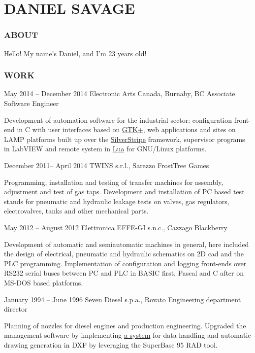 \documentclass[10pt]{tccv}
\begin{document}
\part{DANIEL SAVAGE}

\flafamily

\section{ABOUT}

Hello! My name's Daniel, and I'm 23 years old! 

\section{WORK}

\begin{eventlist}

\item{May 2014 -- December 2014}
     {Electronic Arts Canada, Burnaby, BC}
     {Associate Software Engineer}

Development of automation software for the industrial sector:
configuration front-end in C with user interfaces based on
\href{http://www.gtk.org/}{GTK+}, web applications and sites
on LAMP platforms built up over the
\href{http://www.silverstripe.org/}{SilverStripe} framework,
supervisor programs in LabVIEW and remote system in
\href{http://www.lua.org/}{Lua} for GNU/Linux platforms.

\item{December 2011-- April 2014}
     {TWINS s.r.l., Sarezzo}
     {FrostTree Games}

Programming, installation and testing of transfer machines for assembly,
adjustment and test of gas taps. Development and installation of PC
based test stands for pneumatic and hydraulic leakage tests on valves,
gas regulators, electrovalves, tanks and other mechanical parts.

\item{May 2012 -- August 2012}
     {Elettronica EFFE-GI s.n.c., Cazzago}
     {Blackberry}

Development of automatic and semiautomatic machines in general, here
included the design of electrical, pneumatic and hydraulic schematics on
2D cad and the PLC programming. Implementation of configuration and
logging front-ends over RS232 serial buses between PC and PLC in BASIC
first, Pascal and C after on MS-DOS based platforms.

\item{January 1994 -- June 1996}
     {Seven Diesel s.p.a., Rovato}
     {Engineering department director}

Planning of nozzles for diesel engines and production engineering.
Upgraded the management software by implementing
\href{http://adg.entidi.com/home/history/}{a system} for data handling
and automatic drawing generation in DXF by leveraging the SuperBase 95
RAD tool.

\end{eventlist}
\end{document}
